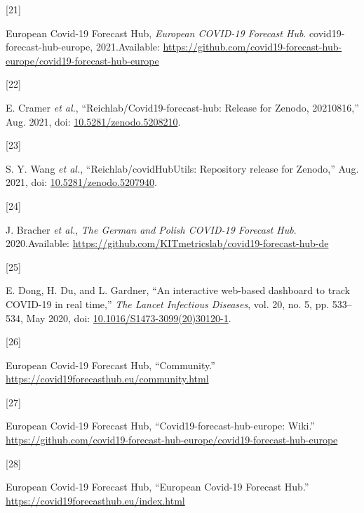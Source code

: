 \documentclass[
]{article}
\newlength{\cslhangindent}
\newlength{\csllabelwidth}
\newlength{\cslentryspacingunit} %
\newenvironment{CSLReferences}[2] %
 {%
  \setlength{\parindent}{0pt}
  \ifodd #1
  \let\oldpar\par
  \def\par{\hangindent=\cslhangindent\oldpar}
  \fi
  \setlength{\parskip}{#2\cslentryspacingunit}
 }%
 {}
\newcommand{\CSLLeftMargin}[1]{\parbox[t]{\csllabelwidth}{#1}}
\newcommand{\CSLRightInline}[1]{\parbox[t]{\linewidth - \csllabelwidth}{#1}\break}
\begin{document}
\begin{CSLReferences}{0}{0}
\leavevmode{}%
\CSLLeftMargin{{[}21{]} }
\CSLRightInline{European Covid-19 Forecast Hub, \emph{European {COVID-19 Forecast Hub}}. {covid19-forecast-hub-europe}, 2021.Available: \url{https://github.com/covid19-forecast-hub-europe/covid19-forecast-hub-europe}}

\leavevmode{}%
\CSLLeftMargin{{[}22{]} }
\CSLRightInline{E. Cramer \emph{et al.}, {``Reichlab/Covid19-forecast-hub: Release for {Zenodo}, 20210816,''} Aug. 2021, doi: \href{https://doi.org/10.5281/zenodo.5208210}{10.5281/zenodo.5208210}.}

\leavevmode{}%
\CSLLeftMargin{{[}23{]} }
\CSLRightInline{S. Y. Wang \emph{et al.}, {``Reichlab/{covidHubUtils}: Repository release for {Zenodo},''} Aug. 2021, doi: \href{https://doi.org/10.5281/zenodo.5207940}{10.5281/zenodo.5207940}.}

\leavevmode{}%
\CSLLeftMargin{{[}24{]} }
\CSLRightInline{J. Bracher \emph{et al.}, \emph{The {German} and {Polish COVID-19 Forecast Hub}}. 2020.Available: \url{https://github.com/KITmetricslab/covid19-forecast-hub-de}}

\leavevmode{}%
\CSLLeftMargin{{[}25{]} }
\CSLRightInline{E. Dong, H. Du, and L. Gardner, {``An interactive web-based dashboard to track {COVID-19} in real time,''} \emph{The Lancet Infectious Diseases}, vol. 20, no. 5, pp. 533--534, May 2020, doi: \href{https://doi.org/10.1016/S1473-3099(20)30120-1}{10.1016/S1473-3099(20)30120-1}.}

\leavevmode{}%
\CSLLeftMargin{{[}26{]} }
\CSLRightInline{European Covid-19 Forecast Hub, {``Community.''} \url{https://covid19forecasthub.eu/community.html}}

\leavevmode{}%
\CSLLeftMargin{{[}27{]} }
\CSLRightInline{European Covid-19 Forecast Hub, {``Covid19-forecast-hub-europe: {Wiki}.''} \url{https://github.com/covid19-forecast-hub-europe/covid19-forecast-hub-europe}}

\leavevmode{}%
\CSLLeftMargin{{[}28{]} }
\CSLRightInline{European Covid-19 Forecast Hub, {``European {Covid-19 Forecast Hub}.''} \url{https://covid19forecasthub.eu/index.html}}


\end{CSLReferences}
\end{document}
